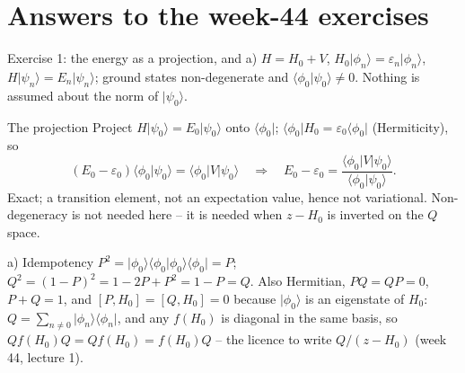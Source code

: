 \documentclass[aspectratio=169,10pt]{beamer}
\newcommand{\ket}[1]{\vert #1\rangle}
\newcommand{\bra}[1]{\langle #1\vert}
\newcommand{\braket}[2]{\langle #1\vert #2\rangle}
\newcommand{\mel}[3]{\langle #1\lvert #2\rvert #3\rangle}
\begin{document}
\section{Answers to the week-44 exercises}

\begin{frame}[shrink=8]{Exercise 1: the energy as a projection, and a)}
\(H=H_0+V\), \(H_0\ket{\phi_n}=\varepsilon_n\ket{\phi_n}\), \(H\ket{\psi_n}=E_n\ket{\psi_n}\); ground states non-degenerate and \(\braket{\phi_0}{\psi_0}\ne0\). Nothing is assumed about the norm of \(\ket{\psi_0}\).
\begin{block}{The projection}
Project \(H\ket{\psi_0}=E_0\ket{\psi_0}\) onto \(\bra{\phi_0}\); \(\bra{\phi_0}H_0=\varepsilon_0\bra{\phi_0}\) (Hermiticity), so
\[
(E_0-\varepsilon_0)\braket{\phi_0}{\psi_0}=\mel{\phi_0}{V}{\psi_0}
\quad\Longrightarrow\quad
\boxed{E_0-\varepsilon_0=\frac{\mel{\phi_0}{V}{\psi_0}}{\braket{\phi_0}{\psi_0}}.}
\]
Exact; a transition element, not an expectation value, hence not variational. Non-degeneracy is not needed here -- it is needed when \(z-H_0\) is inverted on the \(Q\) space.
\end{block}
\begin{block}{a) Idempotency}
\(P^2=\ket{\phi_0}\braket{\phi_0}{\phi_0}\bra{\phi_0}=P\); \(Q^2=(1-P)^2=1-2P+P^2=1-P=Q\). Also Hermitian, \(PQ=QP=0\), \(P+Q=1\), and \([P,H_0]=[Q,H_0]=0\) because \(\ket{\phi_0}\) is an eigenstate of \(H_0\): \(Q=\sum_{n\ne0}\ket{\phi_n}\bra{\phi_n}\), and any \(f(H_0)\) is diagonal in the same basis, so \(Qf(H_0)Q=Qf(H_0)=f(H_0)Q\) -- the licence to write \(Q/(z-H_0)\) (week 44, lecture 1).
\end{block}
\end{frame}
\end{document}

